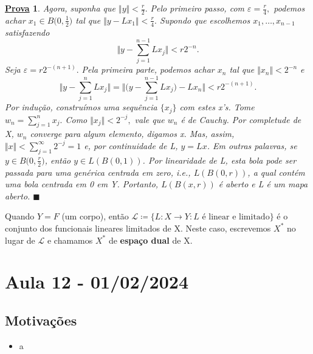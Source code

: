 \documentclass{article}
\newtheorem*{proof*}{\underline{Prova}}
\renewcommand\qedsymbol{$\blacksquare$}
\begin{document}
\begin{proof*}
  Agora, suponha que \(\Vert y \Vert < \frac{r}{2}.\) Pelo primeiro passo, com \(\varepsilon  = \frac{r}{4}, \) podemos achar \(x_1\in B \biggl(0, \frac{1}{2}\biggr)\) tal que \(\Vert y - Lx_1 \Vert < \frac{r}{4}.\) Supondo que escolhemos \(x_1, \dotsc , x_{n-1}\) satisfazendo 
    \[
      \biggl\Vert y - \sum\limits_{j=1}^{n-1}Lx_{j} \biggr\Vert < r2^{-n}.
    \]
  Seja \(\varepsilon  = r2^{-(n+1)}.\) Pela primeira parte, podemos achar \(x_{n}\) tal que \(\Vert x_{n} \Vert < 2^{-n}\) e 
    \[
      \biggl\Vert y - \sum\limits_{j=1}^{n}Lx_{j} \biggr\Vert = \biggl\Vert \biggl(y - \sum\limits_{j=1}^{n-1}Lx_{j}\biggr) - Lx_{n} \biggr\Vert < r2^{-(n+1)}.
    \]
  Por indução, construímos uma sequência \(\{x_{j}\}\) com estes x's. Tome \(w_{n} = \sum\limits_{j=1}^{n}x_{j}.\) Como \(\Vert x_{j} \Vert < 2^{-j},\) vale que \(w_{n}\) é de Cauchy. Por completude de X, \(w_{n}\) converge para algum elemento, digamos x. Mas, assim, \(\Vert x \Vert < 
  \sum\limits_{j=1}^{\infty} 2^{-j} = 1\) e, por continuidade de L, \(y = Lx\). Em outras palavras, se \(y\in B \biggl(0, \frac{r}{2}\biggr)\), então \(y\in L(B(0, 1))\). Por linearidade de L, esta bola pode ser passada para uma genérica centrada em zero, \textit{i.e.}, \(L(B(0, r))\), a qual contém 
  uma bola centrada em 0 em Y. Portanto, \(L(B(x, r))\) é aberto e L é um mapa aberto. \qedsymbol
 \end{proof*}
  Quando \(Y = F\) (um corpo), então \(\mathcal{L}\coloneqq \{L:X\rightarrow Y: L \text{ é linear e limitado}\}\) é o conjunto dos funcionais lineares limitados de X. Neste caso, escrevemos \(X^{*}\) no lugar de \(\mathcal{L}\) e chamamos \(X^{*}\) de \textbf{espaço dual} de X.
\newpage

\section{Aula 12 - 01/02/2024}
\subsection{Motivações}
 \begin{itemize}
   \item a
 \end{itemize}
\end{document}
